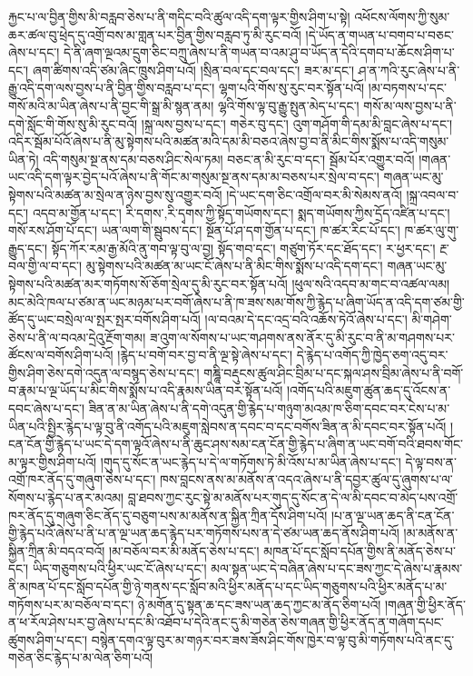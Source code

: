 རྐྱང་པ་ལ་བྱིན་གྱིས་མི་བརླབ་ཅེས་པ་ནི་གདིང་བའི་ཚུལ་འདི་དག་ལྟར་གྱིས་ཤིག་པ་སྟེ། འཕོངས་ལོགས་ཀྱི་སུམ་ཆར་ཚལ་བུ་ཕྲེད་དུ་འགྲོ་བས་མ་གླན་པར་བྱིན་གྱིས་བརླབ་ཏུ་མི་རུང་བའོ། །དེ་ཡོད་ན་གཡན་པ་བགབ་པ་བཅང་ཞེས་པ་དང་། དེ་ནི་ཞག་ལྔའམ་དྲུག་ཅིང་བཀྲུ་ཞེས་པ་ནི་གཡན་བ་འམ་ཤུ་བ་ཡོད་ན་དེའི་དགབ་པ་ཆོངས་ཤིག་པ་དང་། ཞག་ཚིགས་འདི་ཙམ་ཞིང་ཁྲུས་ཤིག་པའོ། །སྲིན་བལ་དང་བལ་དང་། ཟར་མ་དང་། ཤ་ན་ཀའི་རུང་ཞེས་པ་ནི་རྒྱུ་འདི་དག་ལས་བྱས་པ་ནི་བྱིན་གྱིས་བརླབ་པ་དང་། ལྷག་པའི་གོས་སུ་རུང་བར་སྟོན་པའོ། །མ་བཏགས་པ་དང་གསོ་མའི་མ་ཡིན་ཞེས་པ་ནི་བྱང་གི་སྒྲ་མི་སྙན་ནམ། ལྷའི་གོས་ལྟ་བུ་རྒྱུ་སྤུན་མེད་པ་དང་། གསོ་མ་ལས་བྱས་པ་ནི་དགེ་སློང་གི་གོས་སུ་མི་རུང་བའོ། །སྐྲ་ལས་བྱས་པ་དང་། གཅེར་བུ་དང་། འུག་གཤོག་གི་དམ་མི་བླང་ཞེས་པ་དང་། འདིར་སྦོམ་པོའོ་ཞེས་པ་ནི་མུ་སྟེགས་པའི་མཚན་མའི་དམ་མི་བཅའ་ཞེས་བྱ་བ་ནི་མིང་གིས་སྨོས་པ་འདི་གསུམ་ཡིན་ཏེ། འདི་གསུམ་སྔ་ནས་དམ་བཅས་ཤིང་སེལ་ཏམ། བཅང་ན་མི་རུང་བ་དང་། སྦོམ་པོར་འགྱུར་བའོ། །གཞན་ཡང་འདི་དག་ལྟར་བྱེད་པའོ་ཞེས་པ་ནི་གོང་མ་གསུམ་སྔ་ནས་དམ་མ་བཅས་པར་སྲེལ་བ་དང་། གཞན་ཡང་མུ་སྟེགས་པའི་མཚན་མ་སྲེལ་ན་ཉེས་བྱས་སུ་འགྱུར་བའོ། །དེ་ཡང་དག་ཅིང་འགྲོལ་བར་མི་སེམས་ནའོ། །སྐྲ་འབལ་བ་དང་། འདབ་མ་གྱོན་པ་དང་། {རི་དགས་,རི་དྭགས་}ཀྱི་སྟོད་གཡོགས་དང་། སྨད་གཡོགས་ཀྱིས་དྲོད་འཛིན་པ་དང་། གསོ་རས་ཤོག་པོ་དང་། ཡན་ལག་གི་སྦུབས་དང་། སྔོན་པོ་ཤ་དག་གྱོན་པ་དང་། ཁ་ཚར་རིང་པོ་དང་། ཁ་ཚར་ལུ་གུ་རྒྱུད་དང་། སྟོད་ཀོར་རམ་རྒྱ་མོའི་ནུ་གབ་ལྟ་བུ་ལ་བྱ། སྟོད་གབ་དང་། གཙུག་ཏོར་དང་ཐོད་དང་། ར་ཕྱར་དང་། རྔ་བལ་གྱི་ལ་བ་དང་། མུ་སྟེགས་པའི་མཚན་མ་ཡང་ངོ་ཞེས་པ་ནི་མིང་གིས་སྨོས་པ་འདི་དག་དང་། གཞན་ཡང་མུ་སྟེགས་པའི་མཚན་མར་གཏོགས་སོ་ཅོག་སྲེལ་དུ་མི་རུང་བར་སྟོན་པའོ། །ཕུལ་སའི་འདབ་མ་གང་བ་འཚལ་ལམ། མང་མེའི་ཁལ་པ་ཙམ་ན་ཡང་མཉམ་པར་བགོ་ཞེས་པ་ནི་ཁ་ཟས་སམ་གོས་ཀྱི་རྙེད་པ་ཞིག་ཡོད་ན་འདི་དག་ཙམ་གྱི་ཚོད་དུ་ཡང་བསྲེལ་ལ་སྤར་སྤར་བགོས་ཤིག་པའོ། །ལ་བའམ་དེ་དང་འདྲ་བའི་འཆོས་ཏེའོ་ཞེས་པ་དང་། མི་གཤེག་ཅེས་པ་ནི་ལ་བའམ་དྲེའུ་རྔོག་གམ། ཟ་འུག་ལ་སོགས་པ་ཡང་གཤགས་ནས་ནོར་དུ་མི་རུང་བ་ནི་མ་གཤགས་པར་ཚོངས་ལ་བགོས་ཤིག་པའོ། །རྙེད་པ་བགོ་བར་བྱ་བ་ནི་ལྔ་སྟེ་ཞེས་པ་དང་། དེ་རྙེད་པ་འགོད་ཀྱི་ཁྱེད་ཅག་འདུ་བར་གྱིས་ཤིག་ཅེས་དགེ་འདུན་ལ་བསྙད་ཅེས་པ་དང་། གཎྜཱི་བརྡུངས་ཚུལ་ཤིང་བྲིམ་པ་དང་སྐལ་ཤས་བྲིམ་ཞེས་པ་ནི་བགོ་བ་རྣམ་པ་ལྔ་ཡོད་པ་མིང་གིས་སྨོས་པ་འདི་རྣམས་ཡིན་བར་སྟོན་པའོ། །འགོད་པའི་མཇུག་ཚུན་ཆད་དུ་འོངས་ན་དབང་ཞེས་པ་དང་། ཟིན་ན་མ་ཡིན་ཞེས་པ་ནི་དགེ་འདུན་གྱི་རྙེད་པ་གཉུག་མའམ་ཁ་ཅིག་དབང་བར་ངེས་པ་མ་ཡིན་པའི་སྤྱིར་རྙེད་པ་ལྟ་བུ་ནི་འགོད་པའི་མཇུག་སླེབས་ན་དབང་བ་དང་བགོས་ཟིན་ན་མི་དབང་བར་སྟོན་པའོ། །ངན་ངོན་གྱི་རྙེད་པ་ཡང་དེ་དག་ལྟའོ་ཞེས་པ་ནི་ཆུང་ཤས་སམ་ངན་ངོན་གྱི་རྙེད་པ་ཞིག་ན་ཡང་བགོ་བའི་ཐབས་གོང་མ་ལྟར་གྱིས་ཤིག་པའོ། །གུད་དུ་སོང་ན་ཡང་རྙེད་པ་དེ་ལ་གཏོགས་ཏེ་མི་འོས་པ་མ་ཡིན་ཞེས་པ་དང་། དེ་ལྟ་བས་ན་འགྲོ་ཁར་ནོད་དུ་གཞུག་ཅེས་པ་དང་། ཁས་བླངས་ནས་མ་མནོས་ན་འདའ་ཞེས་པ་ནི་དབྱར་ཚུལ་དུ་ཞུགས་པ་ལ་སོགས་པ་རྙེད་པ་ནར་མའམ། བླ་ཐབས་ཀྱང་རུང་སྟེ་མ་མནོས་པར་གུད་དུ་སོང་ན་དེ་ལ་མི་དབང་བ་མེད་པས་འགྲོ་ཁར་ནོད་དུ་གཞུག་ཅིང་ནོད་དུ་བཅུག་པས་མ་མནོས་ན་སྐྱིན་ཀྲིན་དོས་ཤིག་པའོ། །པ་ན་ལྔ་ཡན་ཆད་ནི་ངན་ངོན་གྱི་རྙེད་པའོ་ཞེས་པ་ནི་པ་ན་ལྔ་ཡན་ཆད་རྙེད་པར་གཏོགས་པས་ན་དེ་ཙམ་ཡན་ཆད་ནོས་ཤིག་པའོ། །མ་མནོས་ན་སྐྱིན་ཀྲིན་མི་བདའ་བའོ། །མ་བཅོལ་བར་མི་མནོད་ཅེས་པ་དང་། མཁན་པོ་དང་སློབ་དཔོན་གྱིས་ནི་མནོད་ཅེས་པ་དང་། ཡིད་གཅུགས་པའི་ཕྱིར་ཡང་ངོ་ཞེས་པ་དང་། མལ་སྟན་ཡང་དེ་བཞིན་ཞེས་པ་དང་ཟས་ཀྱང་དེ་ཞེས་པ་རྣམས་ནི་མཁན་པོ་དང་སློབ་དཔོན་གྱི་ཉེ་གནས་དང་སློབ་མའི་ཕྱིར་མནོད་པ་དང་ཡིད་གཅུགས་པའི་ཕྱིར་མནོད་པ་མ་གཏོགས་པར་མ་བཅོལ་བ་དང་། ཉེ་མགོན་དུ་སྟན་ཆ་དང་ཟས་ཡན་ཆད་ཀྱང་མ་ནོད་ཅིག་པའོ། །གཞན་གྱི་ཕྱིར་ནོད་ན་ཕ་རོལ་ཤེས་པར་བྱ་ཞེས་པ་དང་མི་འཐོབ་པ་དེའི་ནང་དུ་མི་གཅེན་ཅེས་གཞན་གྱི་ཕྱིར་ནོད་ན་གཞོག་དཔང་ཚུགས་ཤིག་པ་དང་། བསྙེན་དགའ་ལྟ་བུར་མ་གཉར་བར་ཟས་ཟོས་ཤིང་གོས་ཁྱེར་བ་ལྟ་བུ་མི་གཏོགས་པའི་ནང་དུ་གཅེན་ཅིང་རྙེད་པ་མ་ལེན་ཅིག་པའོ། 